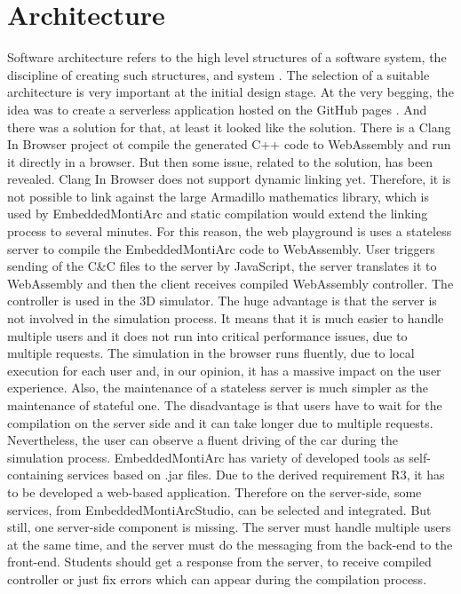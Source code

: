 \section{Architecture}
Software architecture refers to the high level structures of a software system, the discipline of creating such structures, and system \cite{SWArch}. The selection of a suitable architecture is very important at the initial design stage. At the very begging, the idea was to create a serverless application hosted on the GitHub pages \cite{GHPages}. And there was a solution for that, at least it looked like the solution. There is a Clang In Browser \cite{CIB} project ot compile the generated C++ code to WebAssembly and run it directly in a browser. But then some issue, related to the solution, has been revealed. Clang In Browser does not support dynamic linking yet. Therefore, it is not possible to link against the large Armadillo mathematics library, which is used by EmbeddedMontiArc and static compilation would extend the linking process to several minutes. For this reason, the web playground is uses a stateless server to compile the EmbeddedMontiArc code to WebAssembly. User triggers sending of the C\&C files to the server by JavaScript, the server translates it to WebAssembly and then the client receives compiled WebAssembly controller. The controller is used in the 3D simulator. The huge advantage is that the server is not involved in the simulation process. It means that it is much easier to handle multiple users and it does not run into critical performance issues, due to multiple requests. The simulation in the browser runs fluently, due to local execution for each user and, in our opinion, it has a massive impact on the user experience. Also, the maintenance of a stateless server is much simpler as the maintenance of stateful one. The disadvantage is that users have to wait for the compilation on the server side and it can take longer due to multiple requests. Nevertheless, the user can observe a fluent driving of the car during the simulation process.\newline 
EmbeddedMontiArc has variety of developed tools as self-containing services based on .jar files. Due to the derived requirement R3, it has to be developed a web-based application. Therefore on the server-side, some services, from EmbeddedMontiArcStudio, can be selected and integrated. But still, one server-side component is missing. The server must handle multiple users at the same time, and the server must do the messaging from the back-end to the front-end. Students should get a response from the server, to receive compiled controller or just fix errors which can appear during the compilation process.\newline
